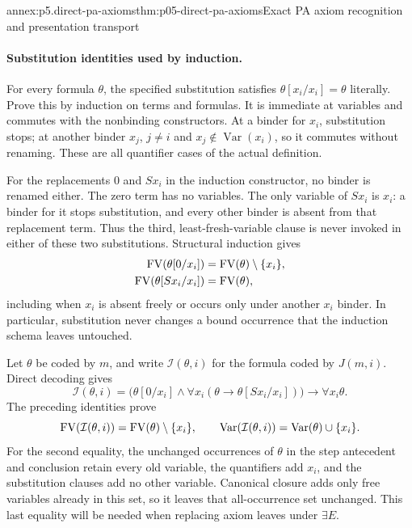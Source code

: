 \begin{annexitem}{annex:p5.direct-pa-axioms}{thm:p05-direct-pa-axioms}{Exact PA axiom recognition and presentation transport}
\paragraph{Substitution identities used by induction.}
For every formula \(\theta\), the specified substitution satisfies
\(\theta[x_i/x_i]=\theta\) literally.  Prove this by induction on
terms and formulas.  It is immediate at variables and commutes with the
nonbinding constructors.  At a binder for \(x_i\), substitution stops;
at another binder \(x_j\), \(j\ne i\) and
\(x_j\notin\operatorname{Var}(x_i)\), so it commutes without renaming.
These are all quantifier cases of the actual definition.

For the replacements \(0\) and \(Sx_i\) in the induction constructor,
no binder is renamed either.  The zero term has no variables.  The only
variable of \(Sx_i\) is \(x_i\): a binder for it stops substitution,
and every other binder is absent from that replacement term.  Thus the
third, least-fresh-variable clause is never invoked in either of these
two substitutions.  Structural induction gives
\[
\begin{aligned}
 \operatorname{FV}(\theta[0/x_i])&=\operatorname{FV}(\theta)\setminus\{x_i\},\\
 \operatorname{FV}(\theta[Sx_i/x_i])&=\operatorname{FV}(\theta),
\end{aligned}
\]
including when \(x_i\) is absent freely or occurs only under another
\(x_i\) binder.  In particular, substitution never changes a bound
occurrence that the induction schema leaves untouched.

Let \(\theta\) be coded by \(m\), and write \(\mathcal I(\theta,i)\)
for the formula coded by \(J(m,i)\).  Direct decoding gives
\[
 \mathcal I(\theta,i)=
 \bigl(\theta[0/x_i]\land
       \forall x_i(\theta\to\theta[Sx_i/x_i])\bigr)
         \to\forall x_i\theta.
\]
The preceding identities prove
\[
 \operatorname{FV}(\mathcal I(\theta,i))=\operatorname{FV}(\theta)\setminus\{x_i\},
 \qquad
 \operatorname{Var}(\mathcal I(\theta,i))
                       =\operatorname{Var}(\theta)\cup\{x_i\}.
\]
For the second equality, the unchanged occurrences of \(\theta\)
in the step antecedent and conclusion retain every old variable, the
quantifiers add \(x_i\), and the substitution clauses add no other
variable.  Canonical closure adds only free variables already in this
set, so it leaves that all-occurrence set unchanged.  This last equality
will be needed when replacing axiom leaves under \(\exists E\).


\end{annexitem}
